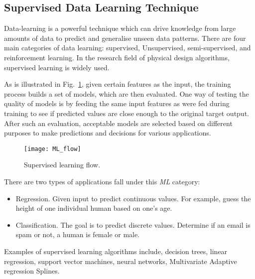 \subsection{Supervised Data Learning Technique}
Data-learning is a powerful technique which can drive knowledge from large amounts of data to predict and generalise unseen data patterns. There are four main categories of data learning: supervised, Unsupervised, semi-supervised, and reinforcement learning. In the research field of physical design algorithms, supervised learning is widely used.

As is illustrated in Fig.~\ref{fig:ml_flow}, given certain features as the input, the training process builds a set of models, which are then evaluated. One way of testing the quality of models is by feeding the same input features as were fed during training to see if predicted values are close enough to the original target output. After such an evaluation, acceptable models are selected based on different purposes to make predictions and decisions for various applications. 
\begin{figure}[tb!]
    \centering
    \texttt{[image: ML\_flow]}
    \caption{Supervised learning flow.}
    \label{fig:ml_flow}
\end{figure}
There are two types of applications fall under this \textit{ML} category:
\begin{itemize}
\item Regression. Given input to predict continuous values. For example, guess the height of one individual human based on one's age. 
\item Classification. The goal is to predict discrete values. Determine if an email is spam or not, a human is female or male. 
\end{itemize}

Examples of supervised learning algorithms include, decision trees, linear regression, support vector machines, neural networks, Multivariate Adaptive regression Splines.

